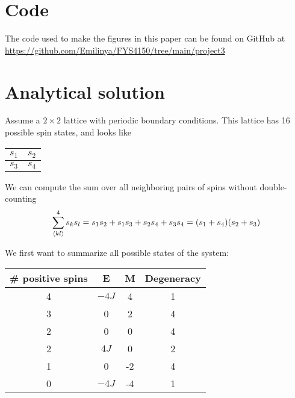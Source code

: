\documentclass[english,notitlepage,reprint,nofootinbib]{revtex4-2}
\begin{document}
\clearpage

\twocolumngrid

\appendix

\section{Code}

The code used to make the figures in this paper can be found on GitHub at \\
\href{https://github.com/Emilinya/FYS4150/tree/main/project3}
{https://github.com/Emilinya/FYS4150/tree/main/project3}

\section{Analytical solution}\label{anasol}
Assume a $2 \times 2$ lattice with periodic boundary conditions. This lattice has 16 possible spin states, and looks like
\begin{center}
    \begin{tabular}{c|c}
        $s_1$ & $s_2$ \\
        \hline
        $s_3$ & $s_4$ \\
    \end{tabular}
\end{center} 

We can compute the sum over all neighboring pairs of spins without double-counting
$$
    \sum_{\left<kl\right>}^4 s_ks_l = s_1s_2 + s_1s_3 + s_2s_4 + s_3s_4 = (s_1 + s_4)(s_2 + s_3)
$$

We first want to summarize all possible states of the system:
\begin{center}
    \begin{tabular}{|c|c|c|c|}
        \hline
        \# positive spins & E & M & Degeneracy \\
        \hline
        4 & $-4J$ & 4 & 1 \\
        3 & 0 & 2 & 4 \\
        2 & 0 & 0 & 4 \\
        2 & $4J$ & 0 & 2 \\
        1 & 0 & -2 & 4 \\
        0 & $-4J$ & -4 & 1 \\
        \hline
    \end{tabular}
\end{center}
\end{document}
